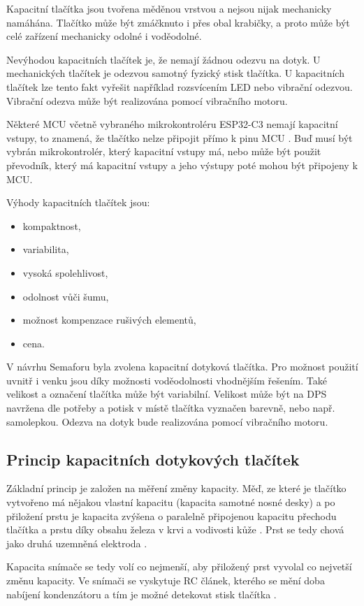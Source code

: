 Kapacitní tlačítka jsou tvořena měděnou vrstvou a nejsou nijak mechanicky namáhána. Tlačítko může být zmáčknuto i přes 
obal krabičky, a proto může být celé zařízení mechanicky odolné i voděodolné. 

Nevýhodou kapacitních tlačítek je, že nemají žádnou odezvu na dotyk. U mechanických tlačítek je odezvou samotný fyzický 
stisk tlačítka. U kapacitních tlačítek lze tento fakt vyřešit například rozsvícením LED nebo vibrační odezvou. Vibrační 
odezva může být realizována pomocí vibračního motoru. 

Některé MCU včetně vybraného mikrokontroléru ESP32-C3 nemají kapacitní
vstupy, to znamená, že tlačítko nelze připojit přímo k pinu MCU \cite{ESP_C3_dtsh}. Buď musí být vybrán mikrokontrolér, který kapacitní 
vstupy má, nebo může být použit převodník, který má kapacitní vstupy a jeho výstupy poté mohou být připojeny k MCU. 

Výhody kapacitních tlačítek jsou:
\begin{itemize}
  \item kompaktnost,
  \item variabilita,
  \item vysoká spolehlivost,
  \item odolnost vůči šumu,
  \item možnost kompenzace rušivých elementů,
  \item cena. 
\end{itemize}

V návrhu Semaforu byla zvolena kapacitní dotyková tlačítka. Pro možnost použití uvnitř i venku jsou díky možnosti voděodolnosti 
vhodnějším řešením. Také velikost a označení tlačítka může být variabilní. Velikost může být na DPS navržena dle potřeby a potisk
v místě tlačítka vyznačen barevně, nebo např. samolepkou. Odezva na dotyk bude realizována pomocí vibračního motoru.

\subsection{Princip kapacitních dotykových tlačítek}
Základní princip je založen na měření změny kapacity. Měď, ze které je tlačítko vytvořeno má
nějakou vlastní kapacitu (kapacita samotné nosné desky) a po přiložení prstu je kapacita zvýšena o paralelně 
připojenou kapacitu přechodu tlačítka a prstu díky obsahu železa v krvi a vodivosti kůže \cite{PrincipKapTl}. 
Prst se tedy chová jako druhá uzemněná elektroda \cite{PrincipKapTl}. 

Kapacita snímače se tedy volí co nejmenší, aby přiložený prst vyvolal co nejvetší změnu kapacity. Ve snímači se vyskytuje
RC článek, kterého se mění doba nabíjení kondenzátoru a tím je možné detekovat stisk tlačítka \cite{PrincipKapTl}. 

